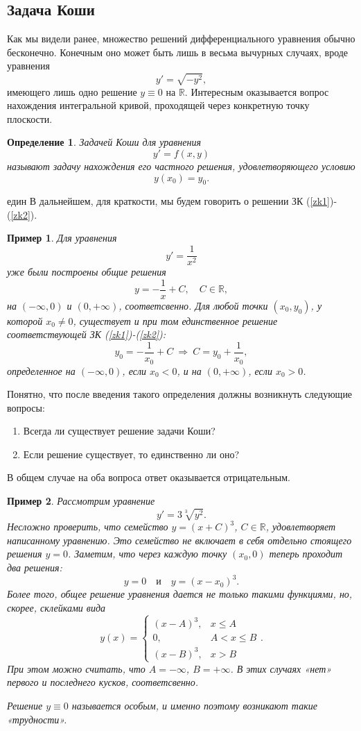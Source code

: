 \documentclass[a4paper,14pt]{extarticle}
\newtheorem{definition}{Определение}[subsection]
\newtheorem{example}{Пример}[subsection]
\newcommand{\be}{\begin{equation}}
\newcommand{\ee}{\end{equation}}
\newcommand{\la}{\label}
\begin{document}
\subsection{Задача Коши}
Как мы видели ранее, множество решений дифференциального уравнения обычно бесконечно. Конечным оно может быть лишь в весьма вычурных случаях, вроде уравнения
$$
y' = \sqrt{-y^2},
$$
имеющего лишь одно решение $y \equiv 0$ на $\mathbb R$. Интересным оказывается вопрос нахождения интегральной кривой, проходящей через конкретную точку плоскости.
\begin{definition}
Задачей Коши для уравнения 
\be\la{zk1}
y' = f(x, y)
\ee
называют задачу нахождения его частного решения, удовлетворяющего условию
\be\la{zk2}
y(x_0)=y_0.
\ee
\end{definition}един
В дальнейшем, для краткости, мы будем говорить о решении ЗК (\ref{zk1})-(\ref{zk2}).
\begin{example}
Для уравнения 
$$
y' = \frac{1}{x^2}
$$	
уже были построены общие решения 
$$
y = -\frac{1}{x} + C, \quad C \in \mathbb R,
$$
на $(-\infty, 0)$ и $(0, +\infty)$, соответсвенно. Для любой точки $(x_0, y_0)$, у которой $x_0 \neq 0$, существует и при том единственное решение соответствующей ЗК (\ref{zk1})-(\ref{zk2}):
$$
y_0 = -\frac{1}{x_0} + C \ \Rightarrow \ C = y_0 + \frac{1}{x_0},
$$
определенное на $(-\infty, 0)$, если $x_0 < 0$, и на $(0, +\infty)$, если $x_0 > 0$.
\end{example}
Понятно, что после введения такого определения должны возникнуть следующие вопросы: 
\begin{enumerate}
\item Всегда ли существует решение задачи Коши?
\item Если решение существует, то единственно ли оно?
\end{enumerate}
В общем случае на оба вопроса ответ оказывается отрицательным.
\begin{example}
	Рассмотрим уравнение
$$
y' = 3 \sqrt[3]{y^2}.
$$
Несложно проверить, что семейство $y = (x + C)^3$, $C \in \mathbb R$, удовлетворяет написанному уравнению. Это семейство не включает в себя отдельно стоящего решения $y = 0$. Заметим, что через каждую точку $(x_0, 0)$ теперь проходит два решения:
$$
y = 0 \quad \text{и} \quad y = (x - x_0)^3.
$$
Более того, общее решение уравнения дается не только такими функциями, но, скорее, склейками вида
$$
y(x) = \begin{cases}
(x - A)^3, & x \leq A\\
0, & A < x \leq B \\
(x - B)^3, & x > B
 \end{cases}.
$$
При этом можно считать, что $A = -\infty$, $B = +\infty$. В этих случаях «нет» первого и последнего кусков, соответсвенно.

Решение $y \equiv 0$ называется особым, и именно поэтому возникают такие «трудности».
\end{example}
\end{document}
